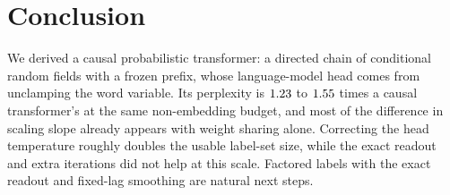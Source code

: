 \section{Conclusion}
\label{sec:conclusion}

We derived a causal probabilistic transformer: a directed chain of conditional random fields with
a frozen prefix, whose language-model head comes from unclamping the word variable. Its
perplexity is $1.23$ to $1.55$ times a causal transformer's at the same
non-embedding budget, and most of the difference in scaling slope already appears with weight
sharing alone. Correcting the head temperature roughly doubles the usable label-set size, while
the exact readout and extra iterations did not help at this scale. Factored labels with the exact
readout and fixed-lag smoothing are natural next steps.
